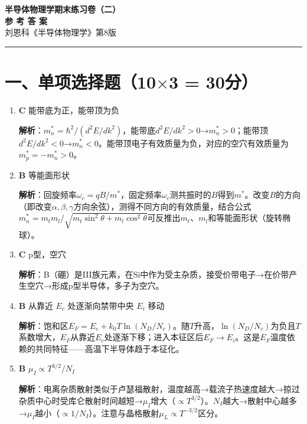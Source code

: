 \documentclass[12pt,a4paper]{ctexart}
\begin{document}
\begin{center}
{\LARGE \textbf{半导体物理学\quad 期末练习卷（二）}}\\[4pt]
{\Large \textbf{参 考 答 案}}\\[6pt]
{\normalsize 刘恩科《半导体物理学》第8版}
\end{center}

\vspace{8pt}
\hrule
\vspace{8pt}

\section*{一、单项选择题（10$\times$3 = 30分）}

\begin{enumerate}[label=\arabic*.,nosep,leftmargin=2em]

\item \textbf{C} 能带底为正，能带顶为负

\textbf{解析}：$m_n^* = \hbar^2 / (d^2E/dk^2)$，能带底$d^2E/dk^2 > 0$→$m_n^* > 0$；能带顶$d^2E/dk^2 < 0$→$m_n^* < 0$。能带顶电子有效质量为负，对应的空穴有效质量为$m_p^* = -m_n^* > 0$。

\item \textbf{B} 等能面形状

\textbf{解析}：回旋频率$\omega_c = qB/m^*$，固定频率$\omega_c$测共振时的$B$得到$m^*$。改变$B$的方向（即改变$\alpha,\beta,\gamma$方向余弦），测得不同方向的有效质量，结合公式$m_n^* = m_t m_l / \sqrt{m_t\sin^2\theta + m_l\cos^2\theta}$可反推出$m_t$、$m_l$和等能面形状（旋转椭球）。

\item \textbf{C} p型，空穴

\textbf{解析}：B（硼）是III族元素，在Si中作为受主杂质，接受价带电子→在价带产生空穴→形成p型半导体，多子为空穴。

\item \textbf{B} 从靠近 $E_c$ 处逐渐向禁带中央 $E_i$ 移动

\textbf{解析}：饱和区$E_F = E_c + k_0T\ln(N_D/N_c)$。随$T$升高，$\ln(N_D/N_c)$为负且$T$系数增大，$E_F$从靠近$E_c$处逐渐下移；进入本征区后$E_F \to E_i$。这是$E_F$温度依赖的共同特征——高温下半导体趋于本征化。

\item \textbf{B} $\mu_I \propto T^{3/2} / N_I$

\textbf{解析}：电离杂质散射类似于卢瑟福散射，温度越高→载流子热速度越大→掠过杂质中心时受库仑散射时间越短→$\mu_I$增大（$\propto T^{3/2}$）。$N_I$越大→散射中心越多→$\mu_I$越小（$\propto 1/N_I$）。注意与晶格散射$\mu_L \propto T^{-3/2}$区分。


\end{enumerate}
\end{document}
